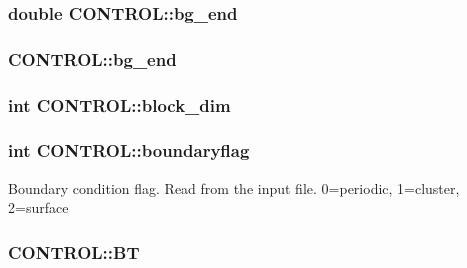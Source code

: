 \hypertarget{struct_c_o_n_t_r_o_l_a43583658d1d29dedb47a66a250a8a45c}{
\subsubsection[{bg\-\_\-end}]{\setlength{\rightskip}{0pt plus 5cm}double C\-O\-N\-T\-R\-O\-L\-::bg\-\_\-end}}\label{struct_c_o_n_t_r_o_l_a43583658d1d29dedb47a66a250a8a45c}
\hypertarget{struct_c_o_n_t_r_o_l_a4b4e514bf445794ca896877851ee9462}{
\subsubsection[{bg\-\_\-end}]{ C\-O\-N\-T\-R\-O\-L\-::bg\-\_\-end}}\label{struct_c_o_n_t_r_o_l_a4b4e514bf445794ca896877851ee9462}
\hypertarget{struct_c_o_n_t_r_o_l_a6a54cfb835904acddaf6f78165a9bacc}{
\subsubsection[{block\-\_\-dim}]{\setlength{\rightskip}{0pt plus 5cm}int C\-O\-N\-T\-R\-O\-L\-::block\-\_\-dim}}\label{struct_c_o_n_t_r_o_l_a6a54cfb835904acddaf6f78165a9bacc}
\hypertarget{struct_c_o_n_t_r_o_l_a3176bb702e3786949f5dfc3959446752}{
\subsubsection[{boundaryflag}]{\setlength{\rightskip}{0pt plus 5cm}int C\-O\-N\-T\-R\-O\-L\-::boundaryflag}}\label{struct_c_o_n_t_r_o_l_a3176bb702e3786949f5dfc3959446752}
Boundary condition flag. Read from the input file. 0=periodic, 1=cluster, 2=surface \hypertarget{struct_c_o_n_t_r_o_l_a531be14b27e46507a6bdc62f36d58baa}{
\subsubsection[{B\-T}]{ C\-O\-N\-T\-R\-O\-L\-::\-B\-T}}\label{struct_c_o_n_t_r_o_l_a531be14b27e46507a6bdc62f36d58baa}
